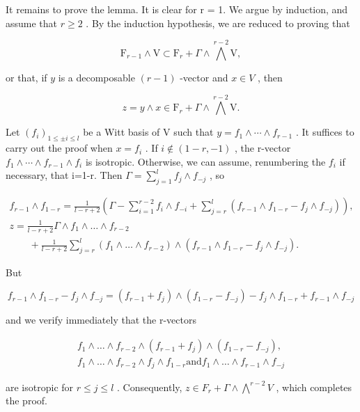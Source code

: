 It remains to prove the lemma. It is clear for r = 1. We argue by induction, and assume that \(r \geq 2\) . By the induction hypothesis, we are reduced to proving that

\[
\mathrm{F} _ {r - 1} \wedge \mathrm{V} \subset \mathrm{F} _ {r} + \Gamma \wedge \bigwedge^ {r - 2} \mathrm{V},
\]

or that, if \(y\) is a decomposable \((r - 1)\) -vector and \(x \in V\) , then

\[
z = y \wedge x \in \mathrm{F} _ {r} + \Gamma \wedge \bigwedge^ {r - 2} \mathrm{V}.
\]

Let \((f_{i})_{1\leq\pm i\leq l}\) be a Witt basis of V such that \(y=f_{1}\wedge\cdots\wedge f_{r-1}\) . It suffices to carry out the proof when \(x=f_{i}\) . If \(i\notin(1-r,-1)\) , the r-vector \(f_{1}\wedge\cdots\wedge f_{r-1}\wedge f_{i}\) is isotropic. Otherwise, we can assume, renumbering the \(f_{i}\) if necessary, that i=1-r. Then \(\Gamma=\sum_{j=1}^{l}f_{j}\wedge f_{-j}\) , so

\[
\begin{array}{l} f _ {r - 1} \wedge f _ {1 - r} = \frac {1}{l - r + 2} \left(\Gamma - \sum_ {i = 1} ^ {r - 2} f _ {i} \wedge f _ {- i} + \sum_ {j = r} ^ {l} (f _ {r - 1} \wedge f _ {1 - r} - f _ {j} \wedge f _ {- j})\right), \\ z = \frac {1}{l - r + 2} \Gamma \wedge f _ {1} \wedge \dots \wedge f _ {r - 2} \\ \qquad + \frac {1}{l - r + 2} \sum_ {j = r} ^ {l} (f _ {1} \wedge \dots \wedge f _ {r - 2}) \wedge (f _ {r - 1} \wedge f _ {1 - r} - f _ {j} \wedge f _ {- j}). \end{array}
\]

But

\[
f _ {r - 1} \wedge f _ {1 - r} - f _ {j} \wedge f _ {- j} = (f _ {r - 1} + f _ {j}) \wedge (f _ {1 - r} - f _ {- j}) - f _ {j} \wedge f _ {1 - r} + f _ {r - 1} \wedge f _ {- j}
\]

and we verify immediately that the r-vectors

\[
\begin{array}{c} f _ {1} \wedge \dots \wedge f _ {r - 2} \wedge (f _ {r - 1} + f _ {j}) \wedge (f _ {1 - r} - f _ {- j}), \\ f _ {1} \wedge \dots \wedge f _ {r - 2} \wedge f _ {j} \wedge f _ {1 - r} \text {and} f _ {1} \wedge \dots \wedge f _ {r - 1} \wedge f _ {- j} \end{array}
\]

are isotropic for \(r \leq j \leq l\) . Consequently, \(z \in F_{r} + \Gamma \wedge \bigwedge^{r-2} V\) , which completes the proof.

